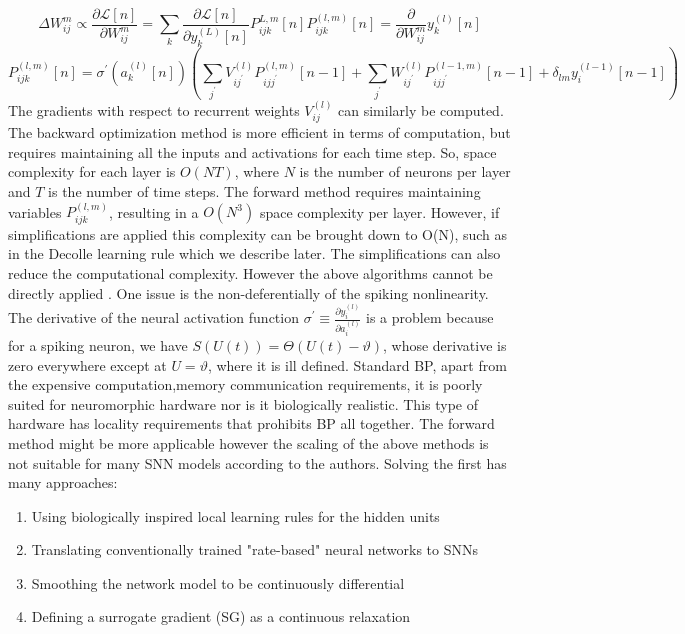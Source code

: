 \documentclass[12pt]{report}
\begin{document}
\begin{equation*}
\Delta W_{i j}^{m} \propto \frac{\partial \mathcal{L}[n]}{\partial W_{i j}^{m}}=\sum_{k} \frac{\partial \mathcal{L}[n]}{\partial y_{k}^{(L)}[n]} P_{i j k}^{L, m}[n]
P_{i j k}^{(l, m)}[n]=\frac{\partial}{\partial W_{i j}^{m}} y_{k}^{(l)}[n]
\end{equation*}
\begin{equation*}
P_{i j k}^{(l, m)}[n]=\sigma^{\prime}\left(a_{k}^{(l)}[n]\right)\left(\sum_{j^{\prime}} V_{i j^{\prime}}^{(l)} P_{i j j^{\prime}}^{(l, m)}[n-1]+\sum_{j^{\prime}} W_{i j^{\prime}}^{(l)} P_{i j j^{\prime}}^{(l-1, m)}[n-1]+\delta_{l m} y_{i}^{(l-1)}[n-1]\right)
\end{equation*}
The gradients with respect to recurrent weights $V_{i j}^{(l)}$  can similarly be computed. The backward optimization method is more efficient in terms of computation, but requires maintaining all the inputs and activations for each time step. So, space complexity for each layer is $O(N T)$, where $N$ is the number of neurons per layer and $T$ is the number of time steps. The forward method requires maintaining variables $P_{i j k}^{(l, m)}$, resulting in a $O\left(N^{3}\right)$ space complexity per layer. However, if simplifications are applied this complexity can be brought down to  O(N), such as in the Decolle learning rule which we describe later. The simplifications can also reduce the computational complexity.
However the above algorithms cannot be directly applied . One issue is the non-deferentially of the spiking nonlinearity. The derivative of the neural activation function $\sigma^{\prime} \equiv \frac{\partial y_{i}^{(l)}}{\partial a_{i}^{(l)}}$ is a problem because for a spiking neuron,  we have $S(U(t))=\Theta(U(t)-\vartheta)$, whose derivative is zero everywhere except at $U=\vartheta$, where it is ill defined. Standard BP, apart from the expensive computation,memory communication requirements, it is poorly suited for neuromorphic hardware nor is it biologically realistic. This type of hardware has locality requirements that prohibits BP all together. The forward method might be more applicable however the scaling of the above methods is not suitable for many SNN models according to the authors.
Solving the first has many approaches:
\begin{enumerate}
\item Using biologically inspired local learning rules for the hidden units
\item Translating conventionally trained "rate-based" neural networks to SNNs
\item Smoothing the network model to be continuously differential
\item Defining a surrogate gradient (SG) as a continuous relaxation
\end{enumerate}
\end{document}
